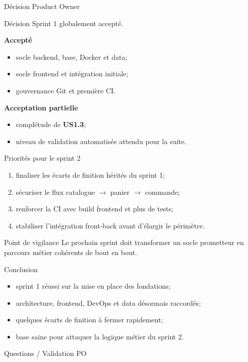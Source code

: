 \documentclass[10pt,aspectratio=169]{beamer}
\begin{document}
\begin{frame}{Décision Product Owner}
  \begin{block}{Décision}
    Sprint 1 globalement accepté.
  \end{block}

  \textbf{Accepté}
  \begin{itemize}
    \item socle backend, base, Docker et data;
    \item socle frontend et intégration initiale;
    \item gouvernance Git et première CI.
  \end{itemize}

  \textbf{Acceptation partielle}
  \begin{itemize}
    \item complétude de \textbf{US1.3};
    \item niveau de validation automatisée attendu pour la suite.
  \end{itemize}
\end{frame}

\begin{frame}{Priorités pour le sprint 2}
  \begin{enumerate}
    \item finaliser les écarts de finition hérités du sprint 1;
    \item sécuriser le flux catalogue $\rightarrow$ panier $\rightarrow$ commande;
    \item renforcer la CI avec build frontend et plus de tests;
    \item stabiliser l'intégration front-back avant d'élargir le périmètre.
  \end{enumerate}

  \vspace{0.3cm}

  \begin{block}{Point de vigilance}
    Le prochain sprint doit transformer un socle prometteur en parcours métier cohérents de bout en bout.
  \end{block}
\end{frame}

\begin{frame}{Conclusion}
  \begin{itemize}
    \item sprint 1 réussi sur la mise en place des fondations;
    \item architecture, frontend, DevOps et data désormais raccordés;
    \item quelques écarts de finition à fermer rapidement;
    \item base saine pour attaquer la logique métier du sprint 2.
  \end{itemize}

  \vspace{0.5cm}

  \centering
  \Large Questions / Validation PO
\end{frame}
\end{document}

